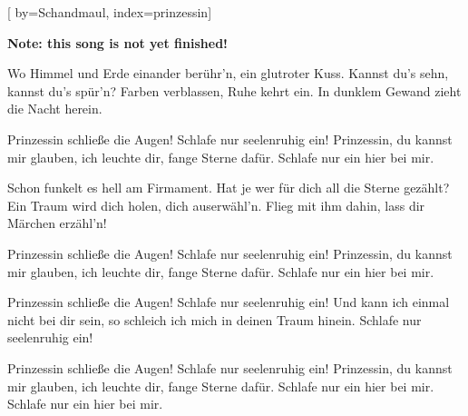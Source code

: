 
[%
    by={Schandmaul},
    index={prinzessin}]


    \label{prinzessin}

    \textbf{Note: this song is not yet finished!}

    \beginverse\memorize[verse]
        Wo Himmel und Erde einander berühr'n, ein glutroter Kuss.
        Kannst du's sehn, kannst du's spür'n?
        Farben verblassen, Ruhe kehrt ein.
        In dunklem Gewand zieht die Nacht herein.
    \endverse

    \beginchorus\memorize[chorus]
        Prinzessin schließe die Augen!
        Schlafe nur seelenruhig ein!
        Prinzessin, du kannst mir glauben, ich leuchte dir,
        fange Sterne dafür.
        Schlafe nur ein hier bei mir.
    \endchorus

    \beginverse\replay[verse]
        Schon funkelt es hell am Firmament.
        Hat je wer für dich all die Sterne gezählt?
        Ein Traum wird dich holen, dich auserwähl'n.
        Flieg mit ihm dahin, lass dir Märchen erzähl'n!
    \endverse

    \beginchorus\replay[chorus]
        Prinzessin schließe die Augen!
        Schlafe nur seelenruhig ein!
        Prinzessin, du kannst mir glauben, ich leuchte dir,
        fange Sterne dafür.
        Schlafe nur ein hier bei mir.
    \endchorus

    \beginchorus\replay[chorus]
        Prinzessin schließe die Augen!
        Schlafe nur seelenruhig ein!
        Und kann ich einmal nicht bei dir sein,
        so schleich ich mich in deinen Traum hinein.
        Schlafe nur seelenruhig ein!
    \endchorus

    \beginchorus\replay[chorus]
        Prinzessin schließe die Augen!
        Schlafe nur seelenruhig ein!
        Prinzessin, du kannst mir glauben, ich leuchte dir,
        fange Sterne dafür.
        Schlafe nur ein hier bei mir.
        Schlafe nur ein hier bei mir. 
    \endchorus
\endsong

